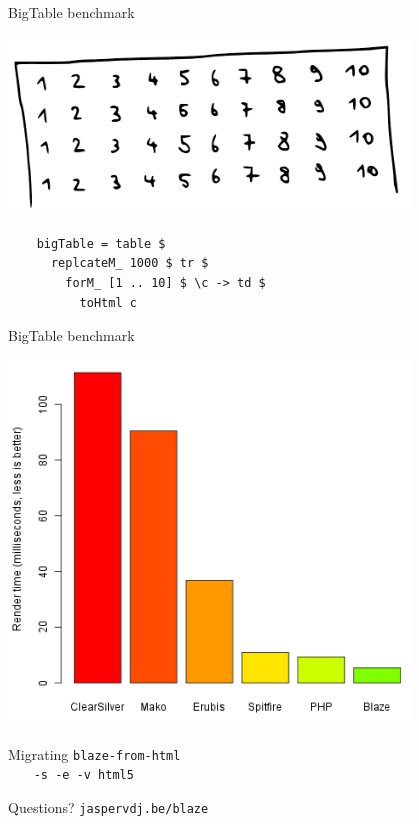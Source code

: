 \documentclass[20pt]{beamer}
\newcommand{\vspaced}{
    \vspace{5mm}
}
\begin{document}
\begin{frame}[fragile, b]{BigTable benchmark}
    \begin{center}
    \includegraphics[width=0.8\textwidth]{images/bigtable.pdf}
    \end{center}
    \begin{lstlisting}
    bigTable = table $
      replcateM_ 1000 $ tr $
        forM_ [1 .. 10] $ \c -> td $
          toHtml c
    \end{lstlisting}
    \vspaced
\end{frame}

\begin{frame}{BigTable benchmark}
    \begin{center}
    \includegraphics[width=0.8\textwidth]{images/benchmarks.png}
    \end{center}
\end{frame}

\begin{frame}{Migrating}
    \texttt{blaze-from-html} \\
    ~~~ \texttt{-s -e -v html5}
\end{frame}

\begin{frame}[plain]
    \begin{center}
    \large{Questions?}
    \texttt{jaspervdj.be/blaze}
    \end{center}
\end{frame}
\end{document}
